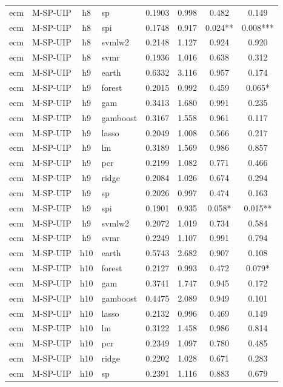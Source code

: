 \begin{ThreePartTable}
\begin{longtable}[t]{llclcccc}
ecm & M-SP-UIP & h8 & sp & 0.1903 & 0.998 & 0.482 & 0.149\\
ecm & M-SP-UIP & h8 & spi & 0.1748 & 0.917 & 0.024** & 0.008***\\
ecm & M-SP-UIP & h8 & svmlw2 & 0.2148 & 1.127 & 0.924 & 0.920\\
ecm & M-SP-UIP & h8 & svmr & 0.1936 & 1.016 & 0.638 & 0.312\\
\addlinespace
ecm & M-SP-UIP & h9 & earth & 0.6332 & 3.116 & 0.957 & 0.174\\
ecm & M-SP-UIP & h9 & forest & 0.2015 & 0.992 & 0.459 & 0.065*\\
ecm & M-SP-UIP & h9 & gam & 0.3413 & 1.680 & 0.991 & 0.235\\
ecm & M-SP-UIP & h9 & gamboost & 0.3167 & 1.558 & 0.961 & 0.117\\
ecm & M-SP-UIP & h9 & lasso & 0.2049 & 1.008 & 0.566 & 0.217\\
ecm & M-SP-UIP & h9 & lm & 0.3189 & 1.569 & 0.986 & 0.857\\
ecm & M-SP-UIP & h9 & pcr & 0.2199 & 1.082 & 0.771 & 0.466\\
ecm & M-SP-UIP & h9 & ridge & 0.2084 & 1.026 & 0.674 & 0.294\\
ecm & M-SP-UIP & h9 & sp & 0.2026 & 0.997 & 0.474 & 0.163\\
ecm & M-SP-UIP & h9 & spi & 0.1901 & 0.935 & 0.058* & 0.015**\\
ecm & M-SP-UIP & h9 & svmlw2 & 0.2072 & 1.019 & 0.734 & 0.584\\
ecm & M-SP-UIP & h9 & svmr & 0.2249 & 1.107 & 0.991 & 0.794\\
\addlinespace
ecm & M-SP-UIP & h10 & earth & 0.5743 & 2.682 & 0.907 & 0.108\\
ecm & M-SP-UIP & h10 & forest & 0.2127 & 0.993 & 0.472 & 0.079*\\
ecm & M-SP-UIP & h10 & gam & 0.3741 & 1.747 & 0.945 & 0.172\\
ecm & M-SP-UIP & h10 & gamboost & 0.4475 & 2.089 & 0.949 & 0.101\\
ecm & M-SP-UIP & h10 & lasso & 0.2132 & 0.996 & 0.469 & 0.149\\
ecm & M-SP-UIP & h10 & lm & 0.3122 & 1.458 & 0.986 & 0.814\\
ecm & M-SP-UIP & h10 & pcr & 0.2349 & 1.097 & 0.780 & 0.485\\
ecm & M-SP-UIP & h10 & ridge & 0.2202 & 1.028 & 0.671 & 0.283\\
ecm & M-SP-UIP & h10 & sp & 0.2391 & 1.116 & 0.883 & 0.679\\

\end{longtable}
\end{ThreePartTable}
